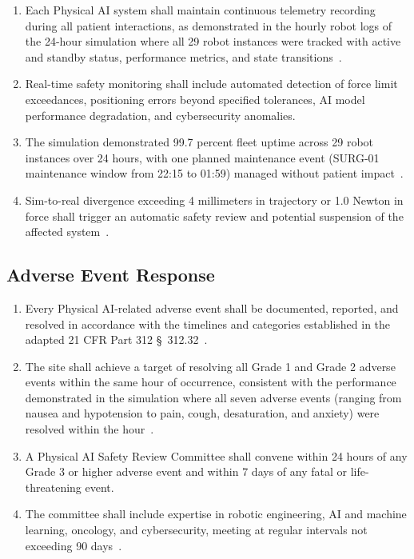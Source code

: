 \documentclass[11pt,letterpaper]{article}
\begin{document}
\begin{enumerate}[label=(\alph*)]
\item Each Physical AI system shall maintain continuous telemetry recording
  during all patient interactions, as demonstrated in the hourly robot logs of
  the 24-hour simulation where all 29 robot instances were tracked with
  active and standby status, performance metrics, and state
  transitions~\cite{newtrial2026}.

\item Real-time safety monitoring shall include automated detection of force
  limit exceedances, positioning errors beyond specified tolerances, AI model
  performance degradation, and cybersecurity anomalies.

\item The simulation demonstrated 99.7 percent fleet uptime across 29 robot
  instances over 24 hours, with one planned maintenance event (SURG-01
  maintenance window from 22:15 to 01:59) managed without patient
  impact~\cite{newtrial2026}.

\item Sim-to-real divergence exceeding 4 millimeters in trajectory or 1.0
  Newton in force shall trigger an automatic safety review and potential
  suspension of the affected system~\cite{cfr312adapt}.
\end{enumerate}

\subsection{Adverse Event Response}

\begin{enumerate}[label=(\alph*)]
\item Every Physical AI-related adverse event shall be documented, reported, and
  resolved in accordance with the timelines and categories established in the
  adapted 21 CFR Part 312 \S~312.32~\cite{cfr312adapt}.

\item The site shall achieve a target of resolving all Grade 1 and Grade 2
  adverse events within the same hour of occurrence, consistent with the
  performance demonstrated in the simulation where all seven adverse events
  (ranging from nausea and hypotension to pain, cough, desaturation, and
  anxiety) were resolved within the hour~\cite{newtrial2026}.

\item A Physical AI Safety Review Committee shall convene within 24 hours of any
  Grade 3 or higher adverse event and within 7 days of any fatal or
  life-threatening event.

\item The committee shall include expertise in robotic engineering, AI and
  machine learning, oncology, and cybersecurity, meeting at regular intervals
  not exceeding 90 days~\cite{cfr312adapt}.
\end{enumerate}
\end{document}
